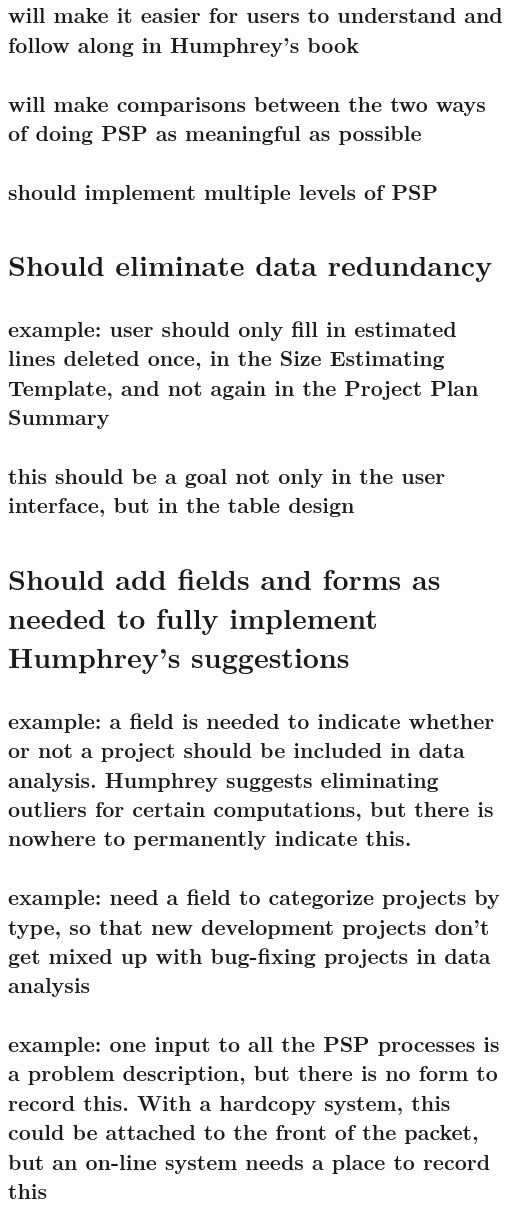 \subsection{will make it easier for users to understand and follow along in
Humphrey's book}
\subsection{will make comparisons between the two ways of doing PSP as
meaningful as possible}
\subsection{should implement multiple levels of PSP}
\section{Should eliminate data redundancy}
\subsection{example: user should only fill in estimated lines deleted once,
in the Size Estimating Template, and not again in the Project Plan Summary}
\subsection{this should be a goal not only in the user interface, but in
the table design}
\section{Should add fields and forms as needed to fully implement
Humphrey's suggestions}
\subsection{example: a field is needed to indicate whether or not a project
should be included in data analysis.  Humphrey suggests eliminating
outliers for certain computations, but there is nowhere to permanently
indicate this.}
\subsection{example: need a field to categorize projects by type, so that
new development projects don't get mixed up with bug-fixing projects in data analysis}
\subsection{example: one input to all the PSP processes is a problem description, but
there is no form to record this.  With a hardcopy system, this could be
attached to the front of the packet, but an on-line system needs a place to
record this}
